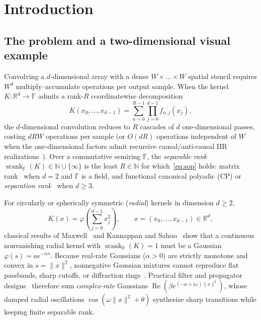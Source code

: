 \documentclass[11pt,a4paper]{article}
\theoremstyle{plain}
\theoremstyle{definition}
\newcommand{\R}{\mathbb{R}}
\newcommand{\N}{\mathbb{N}}
\newcommand{\Field}{\mathbb{F}}
\DeclareMathOperator{\RePart}{Re}
\DeclareMathOperator{\srank}{srank}
\begin{document}
\section{Introduction}\label{sec:intro}

\subsection{The problem and a two-dimensional visual example}\label{sec:visual}

Convolving a $d$-dimensional array with a dense $W \times \dots \times W$ spatial stencil requires $W^d$ multiply--accumulate operations per output sample. When the kernel $K : \R^d \to \Field$ admits a rank-$R$ coordinatewise decomposition
\begin{equation}\label{eq:sop}
  K(x_0, \dots, x_{d-1}) = \sum_{n=0}^{R-1} \prod_{j=0}^{d-1} f_{n,j}(x_j),
\end{equation}
the $d$-dimensional convolution reduces to $R$ cascades of $d$ one-dimensional passes, costing $d R W$ operations per sample (or $O(d R)$ operations independent of $W$ when the one-dimensional factors admit recursive causal/anti-causal IIR realizations~\cite{deriche1987canny,young1995recursive}). Over a commutative semiring $\Field$, the \emph{separable rank} $\srank_{\Field}(K) \in \N \cup \{\infty\}$ is the least $R \in \N$ for which~\eqref{eq:sop} holds: matrix rank~\cite{treitel1971design} when $d = 2$ and $\Field$ is a field, and functional canonical polyadic (CP) or \emph{separation rank}~\cite{hitchcock1927expression,beylkin2005algorithms,kolda2009tensor,hackbusch2012tensor} when $d \ge 3$.

For circularly or spherically symmetric (\emph{radial}) kernels in dimension $d \ge 2$,
\[
  K(x) = \varphi\!\left(\sum_{j=0}^{d-1} x_j^2\right), \qquad x = (x_0,\dots,x_{d-1}) \in \R^d,
\]
classical results of Maxwell~\cite{maxwell1860illustrations} and Kannappan and Sahoo~\cite{kannappan1992rotation} show that a continuous nonvanishing radial kernel with $\srank_{\R}(K) = 1$ must be a Gaussian $\varphi(s) = a e^{-\alpha s}$. Because real-rate Gaussians ($\alpha > 0$) are strictly monotone and convex in $s = \|x\|^2$, nonnegative Gaussian mixtures cannot reproduce flat passbands, sharp cutoffs, or diffraction rings~\cite{zhang2007gaussian}. Practical filter and propagator designs~\cite{niemitalo2010blur,niemitalo2019lowpass,niemitalo_kernel_optimizer,garcia2017circular,lampert2006anisotropic} therefore sum \emph{complex-rate} Gaussians $\RePart(\beta e^{(-\alpha + i\omega)\|x\|^2})$, whose damped radial oscillations $\cos(\omega\|x\|^2 + \theta)$ synthesize sharp transitions while keeping finite separable rank.
\end{document}
